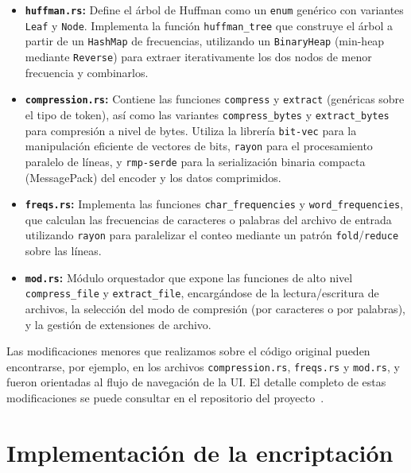 \begin{itemize}
    \item \textbf{\texttt{huffman.rs}:} Define el árbol de Huffman como un \texttt{enum} genérico con variantes \texttt{Leaf} y \texttt{Node}. Implementa la función \texttt{huffman\_tree} que construye el árbol a partir de un \texttt{HashMap} de frecuencias, utilizando un \texttt{BinaryHeap} (min-heap mediante \texttt{Reverse}) para extraer iterativamente los dos nodos de menor frecuencia y combinarlos.

    \item \textbf{\texttt{compression.rs}:} Contiene las funciones \texttt{compress} y \texttt{extract} (genéricas sobre el tipo de token), así como las variantes \texttt{compress\_bytes} y \texttt{extract\_bytes} para compresión a nivel de bytes. Utiliza la librería \texttt{bit-vec} para la manipulación eficiente de vectores de bits, \texttt{rayon} para el procesamiento paralelo de líneas, y \texttt{rmp-serde} para la serialización binaria compacta (MessagePack) del encoder y los datos comprimidos.

    \item \textbf{\texttt{freqs.rs}:} Implementa las funciones \texttt{char\_frequencies} y \texttt{word\_frequencies}, que calculan las frecuencias de caracteres o palabras del archivo de entrada utilizando \texttt{rayon} para paralelizar el conteo mediante un patrón \texttt{fold}/\texttt{reduce} sobre las líneas.

    \item \textbf{\texttt{mod.rs}:} Módulo orquestador que expone las funciones de alto nivel \texttt{compress\_file} y \texttt{extract\_file}, encargándose de la lectura/escritura de archivos, la selección del modo de compresión (por caracteres o por palabras), y la gestión de extensiones de archivo.
\end{itemize}


Las modificaciones menores que realizamos sobre el código original pueden encontrarse, por ejemplo, en los archivos \texttt{compression.rs}, \texttt{freqs.rs} y \texttt{mod.rs}, y fueron orientadas al flujo de navegación de la UI. El detalle completo de estas modificaciones se puede consultar en el repositorio del proyecto~\citep{proyecto_repo}.

\section*{Implementación de la encriptación}

